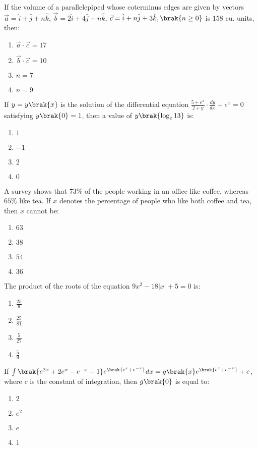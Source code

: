     \item If the volume of a parallelepiped whose coterminus edges are given by vectors $\vec{a} = \hat{i} + \hat{j} + n \hat{k}$, $\vec{b} = 2 \hat{i} + 4 \hat{j} + n \hat{k}$, $\vec{c} = \hat{i} + n \hat{j} + 3 \hat{k}, \brak{n \geq 0}$ is $158$ cu. units, then:
    \begin{enumerate}
        \item $\vec{a} \cdot \vec{c} = 17$
        \item $\vec{b} \cdot \vec{c} = 10$
        \item $n = 7$
        \item $n = 9$
    \end{enumerate}

    \item If $y = y\brak{x}$ is the solution of the differential equation $\frac{5 + e^x}{2+y} \cdot \frac{dy}{dx} + e^x = 0$ satisfying $y\brak{0} = 1$, then a value of $y\brak{\log_e 13}$ is:
    \begin{enumerate}
        \item $1$
        \item $-1$
        \item $2$
        \item $0$
    \end{enumerate}

    \item A survey shows that $73\%$ of the people working in an office like coffee, whereas $65\%$ like tea. If $x$ denotes the percentage of people who like both coffee and tea, then $x$ cannot be:
    \begin{enumerate}
        \item $63$
        \item $38$
        \item $54$
        \item $36$
    \end{enumerate}

    \item The product of the roots of the equation $9x^2 - 18|x| + 5 = 0$ is:
    \begin{enumerate}
        \item $\frac{25}{9}$
        \item $\frac{25}{81}$
        \item $\frac{5}{27}$
        \item $\frac{5}{9}$
    \end{enumerate}

    \item If $\int \brak{e^{2x} + 2e^x - e^{-x} - 1} e^{\brak{e^x + e^{-x}}} dx = g\brak{x} e^{\brak{e^x + e^{-x}}} + c $, where $c$ is the constant of integration, then $g\brak{0}$ is equal to:
    \begin{enumerate}
        \item $2$
        \item $e^2$
        \item $e$
        \item $1$
    \end{enumerate}

